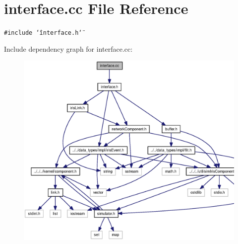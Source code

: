 \section{interface.cc File Reference}
\label{interface_8cc}
{\tt \#include \char`\"{}interface.h\char`\"{}}\par


Include dependency graph for interface.cc:\nopagebreak
\begin{figure}[H]
\begin{center}
\leavevmode
\includegraphics[width=339pt]{interface_8cc__incl}
\end{center}
\end{figure}
